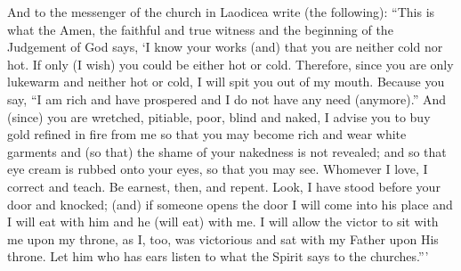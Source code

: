\begin{pages}
\begin{Leftside}
		\pend
		\pstart
		And to the messenger of the church in Laodicea write (the following): “This is what the Amen, the faithful and true witness and the beginning of the Judgement of God says, ‘I know your works (and) that you are neither cold nor hot. If only (I wish) you could be either hot or cold. Therefore, since you are only lukewarm and neither hot or cold, I will spit you out of my mouth. Because you say, “I am rich and have prospered and I do not have any need (anymore).” And (since) you are wretched, pitiable, poor, blind and naked, I advise you to buy gold refined in fire from me so that you may become rich and wear white garments and (so that) the shame of your nakedness is not revealed; and so that eye cream is rubbed onto your eyes, so that you may see. Whomever I love, I correct and teach. Be earnest, then, and repent. Look, I have stood before your door and knocked; (and) if someone opens the door I will come into his place and I will eat with him and he (will eat) with me. I will allow the victor to sit with me upon my throne, as I, too, was victorious and sat with my Father upon His throne. Let him who has ears listen to what the Spirit says to the churches.”’
		\pend
        \endnumbering
    \end{Leftside}

\end{pages} 
\Pages

